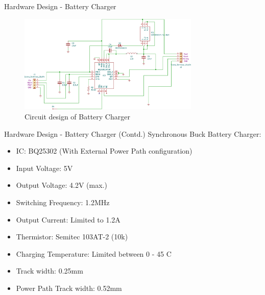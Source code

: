 \documentclass[aspectratio=169]{beamer}
\begin{document}
		
		
		\begin{frame}{Hardware Design - Battery Charger }
			\begin{figure}[h]
				\centering
				\includegraphics[width=0.77\textwidth]{diag/charg.pdf}
				\caption{Circuit design of Battery Charger}
				\label{fig:mesh1}
			\end{figure}
		\end{frame}
		
		
		\begin{frame}{Hardware Design - Battery Charger (Contd.)}
			Synchronous Buck Battery Charger:
			\begin{itemize}
				\item IC: BQ25302 (With External Power Path configuration)
				\item Input Voltage: 5V
				\item Output Voltage: 4.2V (max.)
				\item Switching Frequency: 1.2MHz
				\item Output Current: Limited to 1.2A
				\item Thermistor: Semitec 103AT-2 (10k\ohm)
				\item Charging Temperature: Limited between 0 - 45 C
				\item Track width: 0.25mm
				\item Power Path Track width: 0.52mm
			\end{itemize}
		\end{frame}
		
		
		
\end{document}
